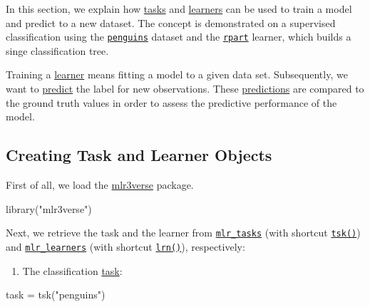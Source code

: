 \documentclass[
]{scrbook}
\newenvironment{Shaded}{\begin{snugshade}}{\end{snugshade}}
\newcommand{\FunctionTok}[1]{\textcolor[rgb]{0.00,0.00,0.00}{#1}}
\newcommand{\NormalTok}[1]{#1}
\newcommand{\OtherTok}[1]{\textcolor[rgb]{0.56,0.35,0.01}{#1}}
\newcommand{\StringTok}[1]{\textcolor[rgb]{0.31,0.60,0.02}{#1}}
\providecommand{\tightlist}{%
  \setlength{\itemsep}{0pt}\setlength{\parskip}{0pt}}
\renewenvironment{Shaded} {\begin{snugshade}\small} {\end{snugshade}}
\begin{document}
In this section, we explain how \protect\hyperlink{tasks}{tasks} and \protect\hyperlink{learners}{learners} can be used to train a model and predict to a new dataset.
The concept is demonstrated on a supervised classification using the \href{https://mlr3.mlr-org.com/reference/mlr_tasks_penguins.html}{\texttt{penguins}} dataset and the \href{https://mlr3.mlr-org.com/reference/mlr_learners_classif.rpart.html}{\texttt{rpart}} learner, which builds a singe classification tree.

Training a \protect\hyperlink{learners}{learner} means fitting a model to a given data set.
Subsequently, we want to \protect\hyperlink{predicting}{predict} the label for new observations.
These \protect\hyperlink{predicting}{predictions} are compared to the ground truth values in order to assess the predictive performance of the model.

\hypertarget{train-predict-objects}{%
\subsection{Creating Task and Learner Objects}\label{train-predict-objects}}

First of all, we load the \href{https://mlr3verse.mlr-org.com}{mlr3verse} package.

\begin{Shaded}
\begin{Highlighting}[]
\FunctionTok{library}\NormalTok{(}\StringTok{"mlr3verse"}\NormalTok{)}
\end{Highlighting}
\end{Shaded}

Next, we retrieve the task and the learner from \href{https://mlr3.mlr-org.com/reference/mlr_tasks.html}{\texttt{mlr\_tasks}} (with shortcut \href{https://mlr3.mlr-org.com/reference/mlr_sugar.html}{\texttt{tsk()}}) and \href{https://mlr3.mlr-org.com/reference/mlr_learners.html}{\texttt{mlr\_learners}} (with shortcut \href{https://mlr3.mlr-org.com/reference/mlr_sugar.html}{\texttt{lrn()}}), respectively:

\begin{enumerate}
\def\labelenumi{\arabic{enumi}.}
\tightlist
\item
  The classification \protect\hyperlink{tasks}{task}:
\end{enumerate}

\begin{Shaded}
\begin{Highlighting}[]
\NormalTok{task }\OtherTok{=} \FunctionTok{tsk}\NormalTok{(}\StringTok{"penguins"}\NormalTok{)}
\end{Highlighting}
\end{Shaded}
\end{document}
